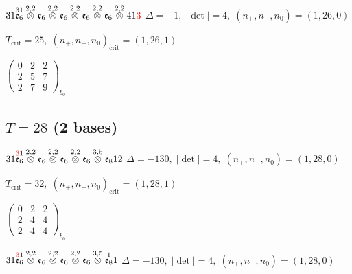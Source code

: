 \documentclass[10pt]{article}
\begin{document}
$31\overset{31}{\mathfrak{e}_6}\overset{2,2}{\otimes}\mathfrak{e}_6\overset{2,2}{\otimes}\mathfrak{e}_6\overset{2,2}{\otimes}\mathfrak{e}_6\overset{2,2}{\otimes}\mathfrak{e}_6\overset{2,2}{\otimes}41\textcolor{red}{3}$ \quad $\Delta=-1,\; |\det|=4,\; (n_+,n_-,n_0)=(1,26,0)$

\hspace{1em}$T_{\text{crit}}=25,\; (n_+,n_-,n_0)_{\text{crit}}=(1,26,1)$

\hspace{2em}$\left(\begin{smallmatrix}0 & 2 & 2 \\ 2 & 5 & 7 \\ 2 & 7 & 9\end{smallmatrix}\right)_{\!b_0}$


\subsection*{$T = 28$ \quad (2 bases)}
\smallskip

$31\overset{\textcolor{red}{3}1}{\mathfrak{e}_6}\overset{2,2}{\otimes}\mathfrak{e}_6\overset{2,2}{\otimes}\mathfrak{e}_6\overset{2,2}{\otimes}\mathfrak{e}_6\overset{3,5}{\otimes}\mathfrak{e}_812$ \quad $\Delta=-130,\; |\det|=4,\; (n_+,n_-,n_0)=(1,28,0)$

\hspace{1em}$T_{\text{crit}}=32,\; (n_+,n_-,n_0)_{\text{crit}}=(1,28,1)$

\hspace{2em}$\left(\begin{smallmatrix}0 & 2 & 2 \\ 2 & 4 & 4 \\ 2 & 4 & 4\end{smallmatrix}\right)_{\!b_0}$

\smallskip

$31\overset{\textcolor{red}{3}1}{\mathfrak{e}_6}\overset{2,2}{\otimes}\mathfrak{e}_6\overset{2,2}{\otimes}\mathfrak{e}_6\overset{2,2}{\otimes}\mathfrak{e}_6\overset{3,5}{\otimes}\overset{1}{\mathfrak{e}_8}1$ \quad $\Delta=-130,\; |\det|=4,\; (n_+,n_-,n_0)=(1,28,0)$
\end{document}
